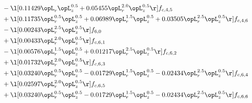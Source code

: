 \begin{alignat}{2}
& - \l[  0.11429 \opL_r \opL_z^{0.5} +  0.05455 \opL_r^{2.0} \opL_z^{0.5}  \r] f_{c,4,5} \nonumber \\ 
& + \l[  0.11735 \opL_r^{0.5} \opL_z^{0.5} +  0.06989 \opL_r^{1.5} \opL_z^{0.5} +  0.03505 \opL_r^{2.5} \opL_z^{0.5}  \r] f_{c,4,6} \nonumber \\ 
& - \l[  0.00243 \opL_r^{2.5} \opL_z^{0.5}  \r] f_{6,0} \nonumber \\ 
& + \l[  0.00433 \opL_r^{2.0} \opL_z^{0.5}  \r] f_{c,6,1} \nonumber \\ 
& - \l[  0.00576 \opL_r^{1.5} \opL_z^{0.5} +  0.01217 \opL_r^{2.5} \opL_z^{0.5}  \r] f_{c,6,2} \nonumber \\ 
& + \l[  0.01732 \opL_r^{2.0} \opL_z^{0.5}  \r] f_{c,6,3} \nonumber \\ 
& + \l[  0.03240 \opL_r^{0.5} \opL_z^{0.5}   -0.01729 \opL_r^{1.5} \opL_z^{0.5}   -0.02434 \opL_r^{2.5} \opL_z^{0.5}  \r] f_{c,6,4} \nonumber \\ 
& + \l[  0.02597 \opL_r^{2.0} \opL_z^{0.5}  \r] f_{c,6,5} \nonumber \\ 
& + \l[  0.03240 \opL_r^{0.5} \opL_z^{0.5}   -0.01729 \opL_r^{1.5} \opL_z^{0.5}   -0.02434 \opL_r^{2.5} \opL_z^{0.5}  \r] f_{c,6,6} \nonumber \\ 
\end{alignat} 


